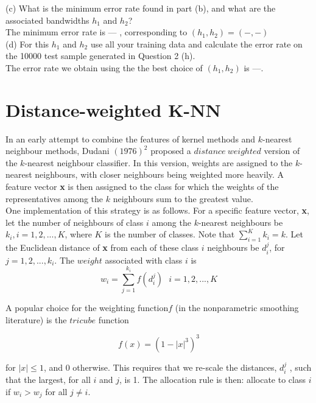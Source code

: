 \documentclass{article}
\begin{document}
(c) What is the minimum error rate found in part (b), and what are the associated bandwidths $h_1$ and $h_2$?\\ 

The minimum error rate is --- , corresponding to $(h_1,h_2)=( -,-)$\\

(d) For this  $h_1$ and $h_2$ use all your training data and calculate the error rate on the 10000 test sample generated in Question 2 (h). \\

The error rate we obtain using the the best choice of $(h_1,h_2)$ is ---.







\section{Distance-weighted K-NN}

In an early attempt to combine the features of kernel methods and $k$-nearest neighbour methods, Dudani $(1976)^2$ proposed a $distance \ weighted$ version of the $k$-nearest neighbour classifier. In this version, weights are assigned to the $k$-nearest neighbours, with closer neighbours being weighted more heavily. A feature vector \textbf{x} is then assigned to the class for which the weights of the representatives among the $k$ neighbours sum to the greatest value.\\
One implementation of this strategy is as follows. For a specific feature vector, \textbf{x}, let the number of neighbours of class $i$ among the $k$-nearest neighbours be $k_{i}, i = 1,2,...,K$, where $K$ is the number of classes. Note that $\sum_{i=1}^{K} k_{i} = k$. Let the Euclidean distance of \textbf{x} from each of these class $i$ neighbours be $d_{i}^{j}$, for $j = 1,2,...,k_{i}$. The $weight$ associated with class $i$ is
$$ w_{i}=\sum_{j=1}^{k_{i}} f(d_{i}^{j}) \ \ \ i= 1,2,...,K$$

A popular choice for the weighting function$f$ (in the nonparametric smoothing literature) is the $tricube$ function

$$f(x)=(1-|x|^3)^3$$

for $|x| \leq 1$, and 0 otherwise. This requires that we re-scale the distances, $d_{i}^{j}$ , such that the largest, for all $i$ and $j$, is 1. The allocation rule is then: allocate to class $i$ if $w_{i} >w_{j}$ for all $j\not=i$.
\end{document}
